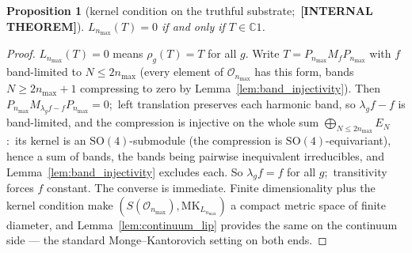 \documentclass[11pt,a4paper]{article}
\theoremstyle{plain}
\newtheorem{proposition}[theorem]{Proposition}
\theoremstyle{definition}
\newcommand{\nmax}{n_{\max}}
\newcommand{\Op}{\mathcal{O}}
\newcommand{\C}{\mathbb{C}}
\begin{document}
\begin{proposition}[kernel condition on the truthful substrate;\ \textbf{[INTERNAL THEOREM]}]
\label{prop:kernel_condition}
$L_{\nmax}(T) = 0$ if and only if $T \in \C 1$.
\end{proposition}

\begin{proof}
$L_{\nmax}(T) = 0$ means $\rho_g(T) = T$ for all $g$. Write $T =
P_{\nmax} M_f P_{\nmax}$ with $f$ band-limited to $N \le 2\nmax$
(every element of $\Op_{\nmax}$ has this form, bands $N \ge 2\nmax + 1$
compressing to zero by Lemma~\ref{lem:band_injectivity}). Then $P_{\nmax}
M_{\lambda_g f - f} P_{\nmax} = 0$;\ left translation preserves each
harmonic band, so $\lambda_g f - f$ is band-limited, and the
compression is injective on the whole sum $\bigoplus_{N \le 2\nmax} E_N$:\
its kernel is an $\mathrm{SO}(4)$-submodule (the compression is
$\mathrm{SO}(4)$-equivariant), hence a sum of bands, the bands being pairwise
inequivalent irreducibles, and Lemma~\ref{lem:band_injectivity} excludes each.
So $\lambda_g f = f$ for all $g$;\ transitivity forces $f$ constant. The converse is immediate.
Finite dimensionality plus the kernel condition make
$(S(\Op_{\nmax}), \mathrm{MK}_{L_{\nmax}})$ a compact metric space of
finite diameter, and Lemma~\ref{lem:continuum_lip} provides the same
on the continuum side --- the standard Monge--Kantorovich setting on
both ends.
\end{proof}
\end{document}
